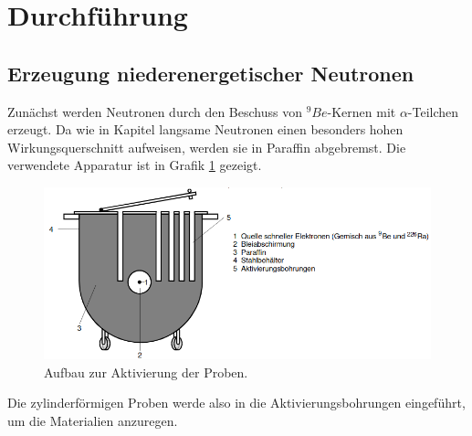 \section{Durchführung}
\label{sec:Durchführung}

\subsection{Erzeugung niederenergetischer Neutronen}
    Zunächst werden Neutronen durch den Beschuss von $^9Be$-Kernen mit $\alpha$-Teilchen erzeugt. Da
    wie in Kapitel \label{sec:Neutronen} langsame Neutronen einen besonders hohen Wirkungsquerschnitt
    aufweisen, werden sie in Paraffin abgebremst. Die verwendete Apparatur ist in Grafik \ref{fig:machdeinearbeit} gezeigt. 
    \begin{figure}[H]
        \centering
        \includegraphics[width=\textwidth]{Neurosen.png}
        \caption{Aufbau zur Aktivierung der Proben.}
        \label{fig:machdeinearbeit}
    \end{figure}
    Die zylinderförmigen Proben werde also in die Aktivierungsbohrungen eingeführt, um die Materialien 
    anzuregen.
